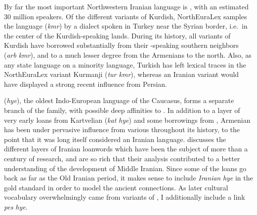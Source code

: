 By far the most important Northwestern Iranian language is , with an estimated 30 million speakers. Of the different variants of Kurdish, NorthEuraLex samples the  language (\textit{kmr}) by a dialect spoken in Turkey near the Syrian border, i.e.\ in the center of the Kurdish-speaking lands. During its history, all variants of Kurdish have borrowed substantially from their -speaking southern neighbors (\textit{arb} \arrowLA \textit{kmr}), and to a much lesser degree from the Armenians to the north. Also, as any state language on a minority language, Turkish has left lexical traces in the NorthEuraLex variant Kurmanji (\textit{tur \arrowLA kmr}), whereas an Iranian variant would have displayed a strong recent influence from Persian.

 (\textit{hye}), the oldest Indo-European language of the Caucasus, forms a separate branch of the family, with possible deep affinities to . In addition to a layer of very early loans from Kartvelian (\textit{kat} \arrowLA \textit{hye}) and some borrowings from , Armenian has been under pervasive influence from various  throughout its history, to the point that it was long itself considered an Iranian language. \cite{bailey1987} discusses the different layers of Iranian loanwords which have been the subject of more than a century of research, and are so rich that their analysis contributed to a better understanding of the development of Middle Iranian. Since some of the loans go back as far as the Old Iranian period, it makes sense to include \textit{Iranian} \arrowOA \textit{hye} in the gold standard in order to model the ancient connections. As later cultural vocabulary overwhelmingly came from
variants of , I additionally include a link \textit{pes} \arrowOA \textit{hye}.

